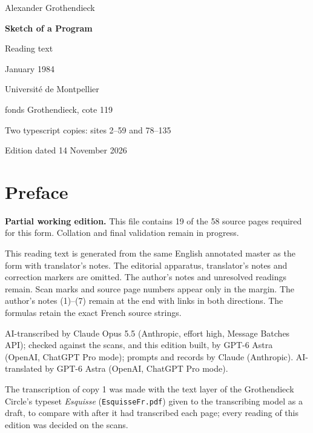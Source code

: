 \documentclass[11pt,a4paper]{article}
\newcommand{\EditionTitle}{Sketch of a Program}
\newcommand{\EditionForm}{Reading text}
\begin{document}
\begin{titlepage}
\centering
\vspace*{18mm}
{\Large Alexander Grothendieck\par}
\vspace{12mm}
{\Huge\bfseries\EditionTitle\par}
\vspace{8mm}
{\Large\EditionForm\par}
\vspace{14mm}
{\large January 1984\par}
\vfill
{\large Université de Montpellier\par fonds Grothendieck, cote 119\par}
\vspace{8mm}
{\normalsize Two typescript copies: sites 2--59 and 78--135\par}
\vspace{8mm}
{\normalsize Edition dated 14 November 2026\par}
\end{titlepage}
\thispagestyle{plain}
\section*{Preface}
\noindent\textbf{Partial working edition.} This file contains 19 of the 58 source pages required for this form. Collation and final validation remain in progress.\par\smallskip
This reading text is generated from the same English annotated master as the form with translator’s notes. The editorial apparatus, translator’s notes and correction markers are omitted. The author’s notes and unresolved readings remain. Scan marks and source page numbers appear only in the margin. The author’s notes (1)–(7) remain at the end with links in both directions. The formulas retain the exact French source strings.

\smallskip
AI-transcribed by Claude Opus 5.5 (Anthropic, effort high, Message Batches API); checked against the scans, and this edition built, by GPT-6 Astra (OpenAI, ChatGPT Pro mode); prompts and records by Claude (Anthropic).
AI-translated by GPT-6 Astra (OpenAI, ChatGPT Pro mode).

The transcription of copy 1 was made with the text layer of the Grothendieck Circle's typeset \textit{Esquisse} (\texttt{EsquisseFr.pdf}) given to the transcribing model as a draft, to compare with after it had transcribed each page; every reading of this edition was decided on the scans.
\end{document}
